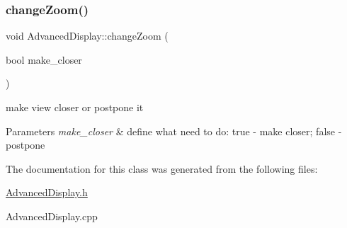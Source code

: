 \subsubsection{\texorpdfstring{change\+Zoom()}{changeZoom()}}
{\footnotesize\ttfamily void Advanced\+Display\+::change\+Zoom (\begin{DoxyParamCaption}\item[{bool}]{make\+\_\+closer }\end{DoxyParamCaption})\hspace{0.3cm}{\ttfamily [private]}}



make view closer or postpone it 


\begin{DoxyParams}{Parameters}
{\em make\+\_\+closer} & define what need to do\+: \textquotesingle{}true\textquotesingle{} -\/ make closer; \textquotesingle{}false\textquotesingle{} -\/ postpone \\
\hline
\end{DoxyParams}


The documentation for this class was generated from the following files\+:\begin{DoxyCompactItemize}
\item 
\hyperlink{_advanced_display_8h}{Advanced\+Display.\+h}\item 
Advanced\+Display.\+cpp\end{DoxyCompactItemize}
